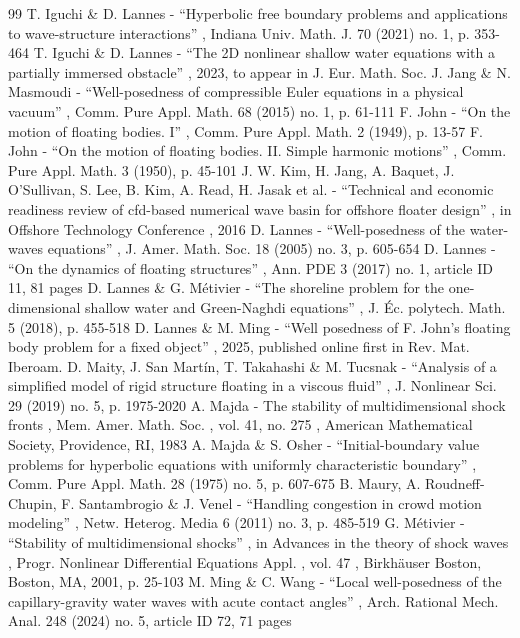 \documentclass[11pt]{article}
\theoremstyle{definition}
\begin{document}
\begin{thebibliography}{99}
 T. Iguchi \& D. Lannes - “Hyperbolic free boundary problems and applications to wave-structure interactions” , Indiana Univ. Math. J. 70 (2021) no. 1, p. 353-464
 T. Iguchi \& D. Lannes - “The 2D nonlinear shallow water equations with a partially immersed obstacle” , 2023, to appear in J. Eur. Math. Soc.
 J. Jang \& N. Masmoudi - “Well-posedness of compressible Euler equations in a physical vacuum” , Comm. Pure Appl. Math. 68 (2015) no. 1, p. 61-111
 F. John - “On the motion of floating bodies. I” , Comm. Pure Appl. Math. 2 (1949), p. 13-57
 F. John - “On the motion of floating bodies. II. Simple harmonic motions” , Comm. Pure Appl. Math. 3 (1950), p. 45-101
 J. W. Kim, H. Jang, A. Baquet, J. O’Sullivan, S. Lee, B. Kim, A. Read, H. Jasak et al. - “Technical and economic readiness review of cfd-based numerical wave basin for offshore floater design” , in Offshore Technology Conference , 2016
 D. Lannes - “Well-posedness of the water-waves equations” , J. Amer. Math. Soc. 18 (2005) no. 3, p. 605-654
 D. Lannes - “On the dynamics of floating structures” , Ann. PDE 3 (2017) no. 1, article ID 11, 81 pages
 D. Lannes \& G. Métivier - “The shoreline problem for the one-dimensional shallow water and Green-Naghdi equations” , J. Éc. polytech. Math. 5 (2018), p. 455-518
 D. Lannes \& M. Ming - “Well posedness of F. John’s floating body problem for a fixed object” , 2025, published online first in Rev. Mat. Iberoam.
 D. Maity, J. San Martín, T. Takahashi \& M. Tucsnak - “Analysis of a simplified model of rigid structure floating in a viscous fluid” , J. Nonlinear Sci. 29 (2019) no. 5, p. 1975-2020
 A. Majda - The stability of multidimensional shock fronts , Mem. Amer. Math. Soc. , vol. 41, no. 275 , American Mathematical Society, Providence, RI, 1983
 A. Majda \& S. Osher - “Initial-boundary value problems for hyperbolic equations with uniformly characteristic boundary” , Comm. Pure Appl. Math. 28 (1975) no. 5, p. 607-675
 B. Maury, A. Roudneff-Chupin, F. Santambrogio \& J. Venel - “Handling congestion in crowd motion modeling” , Netw. Heterog. Media 6 (2011) no. 3, p. 485-519
 G. Métivier - “Stability of multidimensional shocks” , in Advances in the theory of shock waves , Progr. Nonlinear Differential Equations Appl. , vol. 47 , Birkhäuser Boston, Boston, MA, 2001, p. 25-103
 M. Ming \& C. Wang - “Local well-posedness of the capillary-gravity water waves with acute contact angles” , Arch. Rational Mech. Anal. 248 (2024) no. 5, article ID 72, 71 pages

\end{thebibliography}
\end{document}
